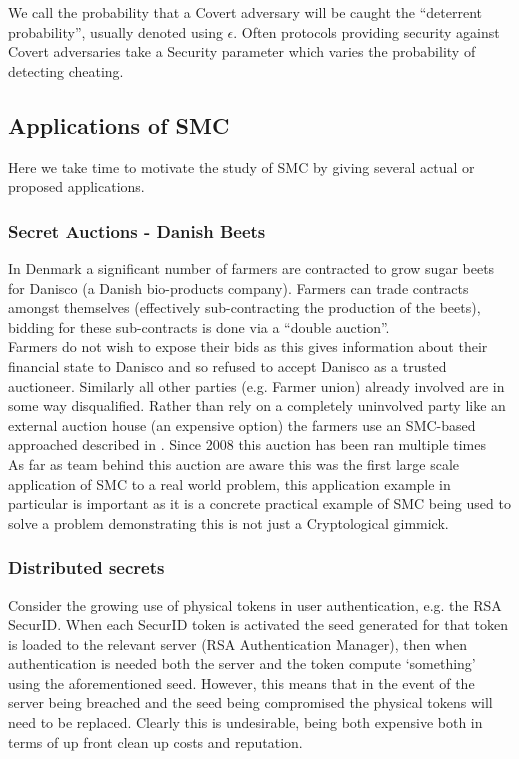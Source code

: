 \documentclass[a4paper,11pt]{article}
\begin{document}
				We call the probability that a Covert adversary will be caught the ``deterrent probability'', usually denoted using $\epsilon$. Often protocols providing security against Covert adversaries take a Security parameter which varies the probability of detecting cheating.


		\subsection{Applications of SMC} \label{Applications}
			Here we take time to motivate the study of SMC by giving several actual or proposed applications.

			\subsubsection{Secret Auctions - Danish Beets} \label{BeetsAuctionApplication}
				In Denmark a significant number of farmers are contracted to grow sugar beets for Danisco (a Danish bio-products company). Farmers can trade contracts amongst themselves (effectively sub-contracting the production of the beets), bidding for these sub-contracts is done via a ``double auction''.\\

				Farmers do not wish to expose their bids as this gives information about their financial state to Danisco and so refused to accept Danisco as a trusted auctioneer. Similarly all other parties (e.g. Farmer union) already involved are in some way disqualified. Rather than rely on a completely uninvolved party like an external auction house (an expensive option) the farmers use an SMC-based approached described in \cite{SugarBeets}. Since 2008 this auction has been ran multiple times \\

				As far as team behind this auction are aware this was the first large scale application of SMC to a real world problem, this application example in particular is important as it is a concrete practical example of SMC being used to solve a problem demonstrating this is not just a Cryptological gimmick.

			\subsubsection{Distributed secrets} \label{DistributedSecretApplication}
				Consider the growing use of physical tokens in user authentication, e.g. the RSA SecurID. When each SecurID token is activated the seed generated for that token is loaded to the relevant server (RSA Authentication Manager), then when authentication is needed both the server and the token compute `something' using the aforementioned seed. However, this means that in the event of the server being breached and the seed being compromised the physical tokens will need to be replaced. Clearly this is undesirable, being both expensive both in terms of up front clean up costs and reputation.\\
\end{document}
